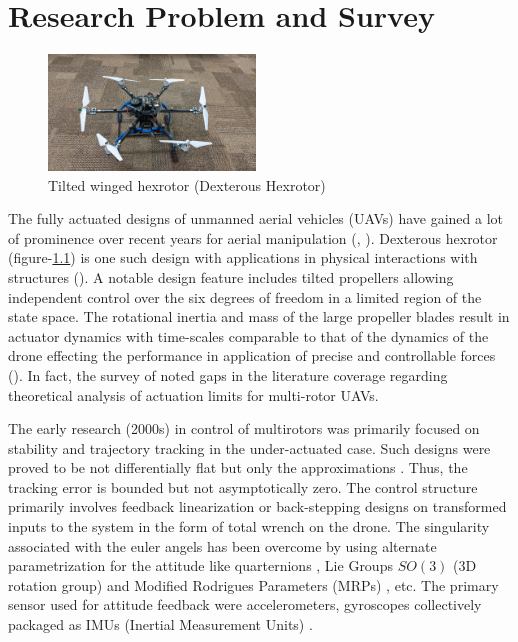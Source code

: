 \chapter{Research Problem and Survey}


\begin{figure}[H]
        \centering
        \includegraphics[width = 0.49\textwidth]{Part2/figs/1_figs/drone.jpg}
        \caption{Tilted winged hexrotor (Dexterous Hexrotor)}
        \label{fig::drone}
\end{figure}


\par The fully actuated designs of unmanned aerial vehicles (UAVs) have gained a lot of prominence over recent years for
aerial manipulation (\cite{ding2021design}, \cite{ryll20176d}). Dexterous hexrotor (figure-\ref{fig::drone}) is one such
design with applications in physical interactions with structures (\cite{jiang2017estimation}). A notable design feature
includes tilted propellers allowing independent control over the six degrees of freedom in a limited region of the state
space. The rotational inertia and mass of the large propeller blades result in actuator dynamics with time-scales
comparable to that of the dynamics of the drone effecting the performance in application of precise and controllable
forces (\cite{hamandi2021design}). In fact, the survey of \cite{hamandi2021design} noted gaps in the literature coverage
regarding theoretical analysis of actuation limits for multi-rotor UAVs.

\par The early research (2000s) in control of multirotors was primarily focused on stability and trajectory tracking in the under-actuated case. Such designs were proved to be not differentially flat but only the approximations \cite{Koo1998}. Thus, the tracking error is bounded but not asymptotically zero. The control structure primarily involves feedback linearization \cite{Mokhtari2004} or back-stepping designs \cite{Mistier2001} on transformed inputs to the system in the form of total wrench on the drone. The singularity associated with the euler angels has been overcome by using alternate parametrization for the attitude like quarternions \cite{Tayebi2006}, Lie Groups $SO(3)$ (3D rotation group)\cite{canYang} and Modified Rodrigues Parameters (MRPs) \cite{crassidis1996attitude}, etc. The primary sensor used for attitude feedback were accelerometers, gyroscopes collectively packaged as IMUs (Inertial Measurement Units) \cite{Martin2010}.


